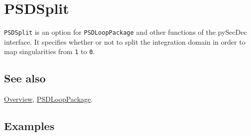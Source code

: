 \documentclass[../FeynHelpersManual.tex]{subfiles}
\begin{document}
\hypertarget{psdsplit}{
\section{PSDSplit}\label{psdsplit}}

\texttt{PSDSplit} is an option for \texttt{PSDLoopPackage} and other
functions of the pySecDec interface. It specifies whether or not to
split the integration domain in order to map singularities from
\texttt{1} to \texttt{0}.

\subsection{See also}

\hyperlink{toc}{Overview}, \hyperlink{psdlooppackage}{PSDLoopPackage}.

\subsection{Examples}
\end{document}
